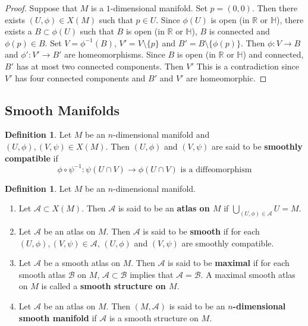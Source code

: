 \documentclass[12pt]{amsart}
\theoremstyle{definition}
\newtheorem{defn}[definition]{Definition}
\renewcommand{\H}{\mathbb{H}}
\newcommand{\R}{\mathbb{R}}
\newcommand{\MA}{\mathcal{A}}
\newcommand{\MB}{\mathcal{B}}
\begin{document}
	\begin{proof}
		Suppose that $M$ is a $1$-dimensional manifold. Set $p = (0,0)$. Then there exists $(U, \phi) \in X(M)$ such that $p \in U$. Since $\phi(U)$ is open (in $\R$ or $\H$), there exists a $B \subset \phi(U)$ such that $B$ is open (in $\R$ or $\H$), $B$ is connected and $\phi(p) \in B$. Set $V = \phi^{-1}(B)$, $V' = V \setminus \{p\}$ and $B' = B \setminus \{\phi(p)\}$. Then $\phi: V \rightarrow B$ and $\phi': V' \rightarrow B'$ are homeomorphisms. Since $B$ is open (in $\R$ or $\H$) and connected, $B'$ has at most two connected components. Then $V'$ This is a contradiction since $V'$ has four connected components and $B'$ and $V'$ are homeomorphic. 
	\end{proof}













	
	
	
	
	
	
	
	
	
	
	
	
	\newpage
	\subsection{Smooth Manifolds}

	\begin{defn}
		Let $M$ be an $n$-dimensional manifold and $(U, \phi), (V, \psi) \in X(M)$. Then $(U, \phi)$ and $(V, \psi)$ are said to be \textbf{smoothly compatible} if $$\phi \circ \psi^{-1}: \psi(U \cap V) \rightarrow \phi (U \cap V) \text{ is a diffeomorphism}$$ 
	\end{defn}

	\begin{defn} Let $M$ be an $n$-dimensional manifold.
		\begin{enumerate}
			\item Let $\MA \subset X(M)$. Then $\MA$ is said to be an \textbf{atlas on $M$} if  $\bigcup\limits_{(U,\phi) \in \MA} U = M$.
			\item Let $\MA$ be an atlas on $M$. Then $\MA$ is said to be \textbf{smooth} if for each $(U, \phi), (V, \psi) \in \MA$, $(U,\phi)$ and $(V,\psi)$ are smoothly compatible.
			\item Let $\MA$ be a smooth atlas on $M$. Then $\MA$ is said to be \textbf{maximal} if for each smooth atlas $\MB$ on $M$, $\MA \subset \MB$ implies that $\MA = \MB$. A maximal smooth atlas on $M$ is called a \textbf{smooth structure on $M$}.
			\item Let $\MA$ be an atlas on $M$. Then $(M, \MA)$ is said to be an \textbf{$n$-dimensional smooth manifold} if $\MA$ is a smooth structure on $M$. 
		\end{enumerate}
	\end{defn}
\end{document}
